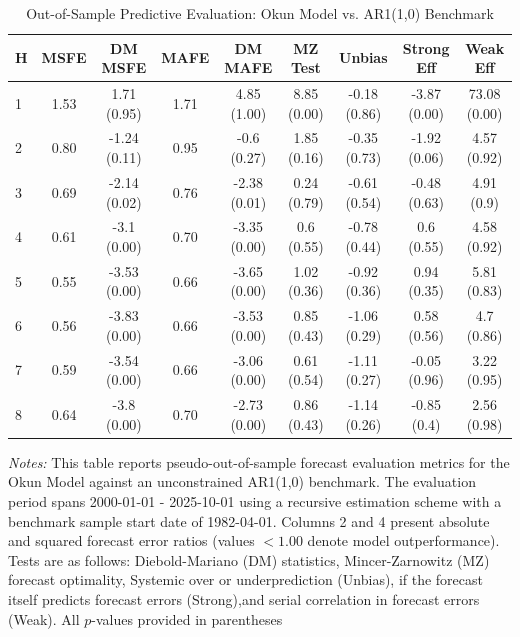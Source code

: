 \begin{table}[htbp]
\centering
\caption{Out-of-Sample Predictive Evaluation: Okun Model vs. AR1(1,0) Benchmark}
\label{tab:okun_model_evaluation}
\footnotesize
\begin{tabular}{l cccccccc}
\hline\hline
\rule{0pt}{3ex}
\textbf{H} & \textbf{MSFE} & \textbf{DM MSFE} & \textbf{MAFE} & \textbf{DM MAFE} & \textbf{MZ Test} & \textbf{Unbias} & \textbf{Strong Eff} & \textbf{Weak Eff} \\[0.5ex]
\hline
\rule{0pt}{2.5ex}
1 & 1.53 & 1.71 (0.95) & 1.71 & 4.85 (1.00) & 8.85 (0.00) & -0.18 (0.86) & -3.87 (0.00) & 73.08 (0.00) \\
2 & 0.80 & -1.24 (0.11) & 0.95 & -0.6 (0.27) & 1.85 (0.16) & -0.35 (0.73) & -1.92 (0.06) & 4.57 (0.92) \\
3 & 0.69 & -2.14 (0.02) & 0.76 & -2.38 (0.01) & 0.24 (0.79) & -0.61 (0.54) & -0.48 (0.63) & 4.91 (0.9) \\
4 & 0.61 & -3.1 (0.00) & 0.70 & -3.35 (0.00) & 0.6 (0.55) & -0.78 (0.44) & 0.6 (0.55) & 4.58 (0.92) \\
5 & 0.55 & -3.53 (0.00) & 0.66 & -3.65 (0.00) & 1.02 (0.36) & -0.92 (0.36) & 0.94 (0.35) & 5.81 (0.83) \\
6 & 0.56 & -3.83 (0.00) & 0.66 & -3.53 (0.00) & 0.85 (0.43) & -1.06 (0.29) & 0.58 (0.56) & 4.7 (0.86) \\
7 & 0.59 & -3.54 (0.00) & 0.66 & -3.06 (0.00) & 0.61 (0.54) & -1.11 (0.27) & -0.05 (0.96) & 3.22 (0.95) \\
8 & 0.64 & -3.8 (0.00) & 0.70 & -2.73 (0.00) & 0.86 (0.43) & -1.14 (0.26) & -0.85 (0.4) & 2.56 (0.98) \\
\hline\hline
\end{tabular}%
\par\smallskip
\parbox{\textwidth}{\scriptsize \textit{Notes:} This table reports pseudo-out-of-sample forecast evaluation metrics for the Okun Model against an unconstrained AR1(1,0) benchmark. The evaluation period spans 2000-01-01 - 2025-10-01 using a recursive estimation scheme with a benchmark sample start date of 1982-04-01. Columns 2 and 4 present absolute and squared forecast error ratios (values $< 1.00$ denote model outperformance). Tests are as follows: Diebold-Mariano (DM) statistics, Mincer-Zarnowitz (MZ) forecast optimality, Systemic over or underprediction (Unbias), if the forecast itself predicts forecast errors (Strong),and serial correlation in forecast errors (Weak). All $p$-values provided in parentheses}
\end{table}
